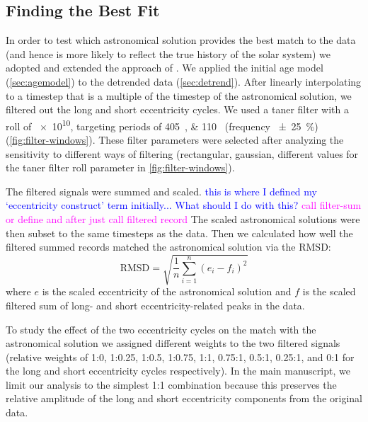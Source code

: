 \documentclass[draft]{agujournal2019}
\newcommand{\rez}{\textcolor{magenta}}
\newcommand{\ijk}{\textcolor{blue}}
\begin{document}
\subsection{Finding the Best Fit}\label{sec:algorithm}

In order to test which astronomical solution provides the best match to the data
(and hence is more likely to reflect the true history of the solar system)
we adopted and extended the approach of .
We applied the initial age model (\cref{sec:agemodel}) to the detrended data (\cref{sec:detrend}).
After linearly interpolating to a timestep that is a multiple of the timestep of the astronomical solution,
we filtered out the long and short eccentricity cycles.
We used a taner filter with a roll of \num{e10}, targeting periods of \qtylist{405;110}{\kiloyear} (frequency \qty{\pm25}{\percent}) (\cref{fig:filter-windows}).
These filter parameters were selected after analyzing the sensitivity to different ways of filtering (rectangular, gaussian, different values for the taner filter roll parameter in \cref{fig:filter-windows}).

The filtered signals were summed and scaled. \ijk{this is where I defined my `eccentricity construct' term initially... What should I do with this?}
\rez{call filter-sum or define and after just call filtered record}
The scaled astronomical solutions were then subset to the same timesteps as the data.
Then we calculated how well the filtered summed records matched the astronomical solution via the \gls{RMSD}:
\begin{equation}\label{eqn:rmsd}
    \text{RMSD} = \sqrt{\frac{1}{n}\sum_{i=1}^{n}(e_{i} - f_{i})^{2}}
\end{equation}
where \(e\) is the scaled eccentricity of the astronomical solution and \(f\) is the scaled filtered sum of long- and short eccentricity-related peaks in the data.

To study the effect of the two eccentricity cycles on the match with the astronomical solution
we assigned different weights to the two filtered signals
(relative weights of 1:0, 1:0.25, 1:0.5, 1:0.75, 1:1, 0.75:1, 0.5:1, 0.25:1, and 0:1 for the long and short eccentricity cycles respectively).
In the main manuscript, we limit our analysis to the simplest 1:1 combination because this preserves the relative amplitude of the long and short eccentricity components from the original data.
\end{document}
